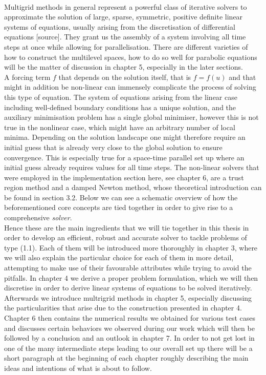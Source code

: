 \documentclass[../draft_1.tex]{subfiles}
\begin{document}
\smallskip
\\
Multigrid methods in general represent a powerful class of iterative solvers to approximate the solution of large, sparse, symmetric, positive definite linear systems of equations, usually arising from the discretisation of differential equations [source]. 
They grant us the assembly of a system involving all time steps at once while allowing for parallelisation. There are different varieties of how to construct the multilevel spaces, how to do so well for parabolic equations will be the matter of discussion in chapter 5, especially in the later sections. 
\smallskip
\\
A forcing term $f$ that depends on the solution itself, that is $f = f(u)$ and that might in addition be non-linear can immensely complicate the process of solving this type of equation. The system of equations arising from the linear case including well-defined boundary conditions has a unique solution, and the auxiliary minimisation problem has a single global minimiser, however this is not true in the nonlinear case, which might have an arbitrary number of local minima.  Depending on the solution landscape one might therefore require an initial guess that is already very close to the global solution to ensure convergence. This is especially true for a space-time parallel set up where an initial guess already requires values for all time steps. The non-linear solvers that were employed in the implementation section here, see chapter 6, are a trust region method and a damped Newton method, whose theoretical introduction can be found in section 3.2. Below we can see a schematic overview of how the beforementioned core concepts are tied together in order to give rise to a comprehensive \textit{solver}. 
\smallskip
\\
Hence these are the main ingredients that we will tie together in this thesis in order to develop an efficient, robust and accurate solver to tackle problems of type (1.1). Each of them will be introduced more thoroughly in chapter 3, where we will also explain the particular choice for each of them in more detail, attempting to make use of their favourable attributes while trying to avoid the pitfalls. In chapter 4 we derive a proper problem formulation, which we will then discretise in order to derive linear systems of equations to be solved iteratively. Afterwards we introduce multrigrid methods in chapter 5, especially discussing the particularities that arise due to the construction presented in chapter 4. Chapter 6 then contains the numerical results we obtained for various test cases and discusses certain behaviors we observed during our work which will then be followed by a conclusion and an outlook in chapter 7. In order to not get lost in one of the many intermediate steps leading to our overall set up there will be a short paragraph at the beginning of each chapter roughly describing the main ideas and intentions of what is about to follow.
\end{document}

